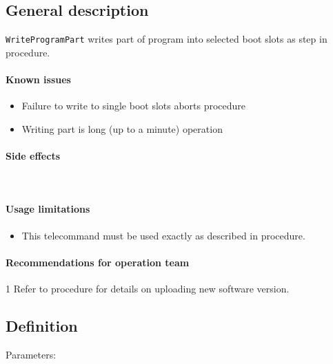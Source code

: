 

\subsection{General description}
\texttt{WriteProgramPart} writes part of program into selected boot slots as step in  procedure.


\paragraph{Known issues}
\begin{itemize}
	\item Failure to write to single boot slots aborts procedure
	\item Writing part is long (up to a minute) operation
\end{itemize}

\paragraph{Side effects}\mbox{}\\ 
\None

\paragraph{Usage limitations}
\begin{itemize}
	\item This telecommand must be used exactly as described in  procedure.
\end{itemize}

\paragraph{Recommendations for operation team}1
Refer to  procedure for details on uploading new software version.


\subsection{Definition}

Parameters: 

\begin{tcarglist}
\end{tcarglist}


